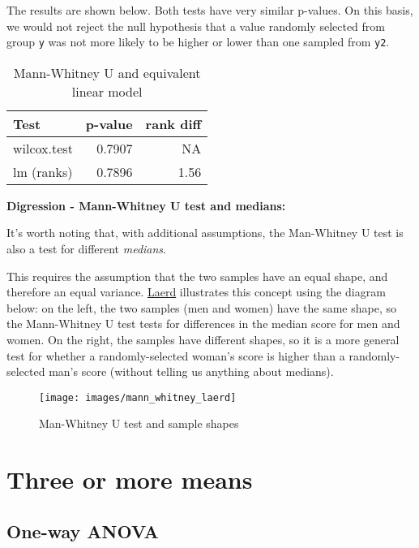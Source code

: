 \documentclass[
  12pt,
]{krantz}
\begin{document}
The results are shown below. Both tests have very similar p-values. On this basis, we would not reject the null hypothesis that a value randomly selected from group \texttt{y} was not more likely to be higher or lower than one sampled from \texttt{y2}.

\begin{table}

\caption{\label{tab:unnamed-chunk-35}Mann-Whitney U and equivalent linear model}
\centering
\begin{tabular}[t]{lrr}
\toprule
Test & p-value & rank diff\\
\midrule
wilcox.test & 0.7907 & NA\\
lm (ranks) & 0.7896 & 1.56\\
\bottomrule
\end{tabular}
\end{table}

\textbf{Digression - Mann-Whitney U test and medians:}

It's worth noting that, with additional assumptions, the Man-Whitney U test is also a test for different \emph{medians}.

This requires the assumption that the two samples have an equal shape, and therefore an equal variance. \href{https://statistics.laerd.com/premium-sample/mwut/mann-whitney-test-in-spss-2.php}{Laerd} illustrates this concept using the diagram below: on the left, the two samples (men and women) have the same shape, so the Mann-Whitney U test tests for differences in the median score for men and women. On the right, the samples have different shapes, so it is a more general test for whether a randomly-selected woman's score is higher than a randomly-selected man's score (without telling us anything about medians).

\begin{figure}

{\centering \texttt{[image: images/mann\_whitney\_laerd]} 

}

\caption{Man-Whitney U test and sample shapes}\label{fig:unnamed-chunk-36}
\end{figure}

\hypertarget{three-or-more-means}{%
\chapter{Three or more means}\label{three-or-more-means}}

\hypertarget{one-way-anova}{%
\section{One-way ANOVA}\label{one-way-anova}}
\end{document}
